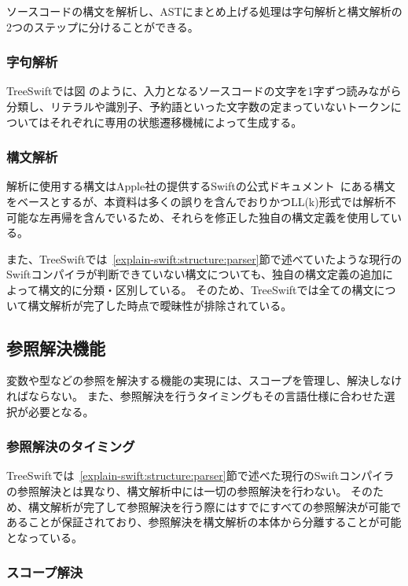 ソースコードの構文を解析し、ASTにまとめ上げる処理は字句解析と構文解析の2つのステップに分けることができる。

\subsubsection{字句解析}

TreeSwiftでは図%
のように、入力となるソースコードの文字を1字ずつ読みながら分類し、リテラルや識別子、予約語といった文字数の定まっていないトークンについてはそれぞれに専用の状態遷移機械によって生成する。

\subsubsection{構文解析}

解析に使用する構文はApple社の提供するSwiftの公式ドキュメント~\cite{swift-grammar}にある構文をベースとするが、本資料は多くの誤りを含んでおりかつLL(k)形式では解析不可能な左再帰を含んでいるため、それらを修正した独自の構文定義を使用している。

また、TreeSwiftでは~\ref{explain-swift:structure:parser}節で述べていたような現行のSwiftコンパイラが判断できていない構文についても、独自の構文定義の追加によって構文的に分類・区別している。
そのため、TreeSwiftでは全ての構文について構文解析が完了した時点で曖昧性が排除されている。


\subsection{参照解決機能}

変数や型などの参照を解決する機能の実現には、スコープを管理し、解決しなければならない。
また、参照解決を行うタイミングもその言語仕様に合わせた選択が必要となる。

\subsubsection{参照解決のタイミング}

TreeSwiftでは~\ref{explain-swift:structure:parser}節で述べた現行のSwiftコンパイラの参照解決とは異なり、構文解析中には一切の参照解決を行わない。
そのため、構文解析が完了して参照解決を行う際にはすでにすべての参照解決が可能であることが保証されており、参照解決を構文解析の本体から分離することが可能となっている。

\subsubsection{スコープ解決}

